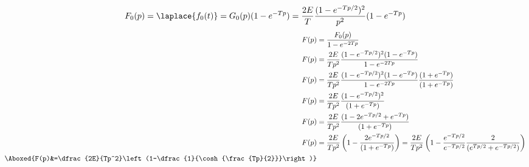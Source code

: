 $$
F_0(p)=\laplace{f_0(t)}=G_0(p)(1-e^{-Tp})
=\dfrac{2E}{T}\dfrac{(1-e^{-Tp/2})^2}{p^2}(1-e^{-Tp})
$$
\begin{align*}
    F(p)&=\dfrac{F_0(p)}{1-e^{-2Tp}} \\
    F(p)&=\dfrac{2E}{Tp^2}\dfrac{(1-e^{-Tp/2})^2(1-e^{-Tp})}{1-e^{-2Tp}}\\
    F(p)&=\dfrac{2E}{Tp^2}\dfrac{(1-e^{-Tp/2})^2(1-e^{-Tp})}{1-e^{-2Tp}}
                          \dfrac{(1+e^{-Tp})}{(1+e^{-Tp})}\\
    F(p)&=\dfrac{2E}{Tp^2}\dfrac{(1-e^{-Tp/2})^2}{(1+e^{-Tp})}\\
    F(p)&=\dfrac{2E}{Tp^2}\dfrac{(1-2e^{-Tp/2}+e^{-Tp})}{(1+e^{-Tp})}\\
    F(p)&=\dfrac{2E}{Tp^2}\left(1-\dfrac{2e^{-Tp/2}}{(1+e^{-Tp})}\right)
         =\dfrac{2E}{Tp^2}\left(1-\dfrac{e^{-Tp/2}}{e^{-Tp/2}}
                                  \dfrac{2}{(e^{Tp/2}+e^{-Tp/2})}\right)\\
\Aboxed{F(p)&=\dfrac{2E}{Tp^2}\left(1-\dfrac{1}{\cosh{\frac{Tp}{2}}}\right)}
\end{align*}
